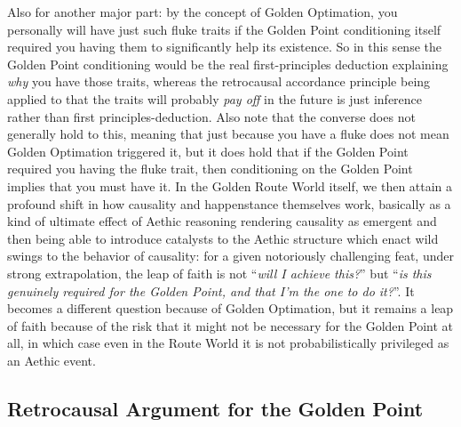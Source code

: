 Also for another major part: by the concept of Golden Optimation, you personally will have just such fluke traits if the Golden Point conditioning itself required you having them to significantly help its existence. So in this sense the Golden Point conditioning would be the real first-principles deduction explaining \textit{why} you have those traits, whereas the retrocausal accordance principle being applied to that the traits will probably \textit{pay off} in the future is just inference rather than first principles-deduction. Also note that the converse does not generally hold to this, meaning that just because you have a fluke does not mean Golden Optimation triggered it, but it does hold that if the Golden Point required you having the fluke trait, then conditioning on the Golden Point implies that you must have it. In the Golden Route World itself, we then attain a profound shift in how causality and happenstance themselves work, basically as a kind of ultimate effect of Aethic reasoning rendering causality as emergent and then being able to introduce catalysts to the Aethic structure which enact wild swings to the behavior of causality: for a given notoriously challenging feat, under strong extrapolation, the leap of faith is not “\textit{will I achieve this?}” but “\textit{is this genuinely required for the Golden Point, and that I'm the one to do it?}”. It becomes a different question because of Golden Optimation, but it remains a leap of faith because of the risk that it might not be necessary for the Golden Point at all, in which case even in the Route World it is not probabilistically privileged as an Aethic event. 

\subsection{Retrocausal Argument for the Golden Point}

